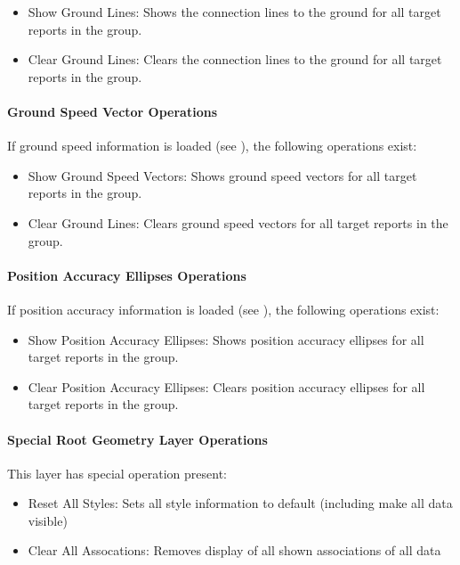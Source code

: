 \begin{itemize}
 \item Show Ground Lines: Shows the connection lines to the ground for all target reports in the group.
 \item Clear Ground Lines: Clears the connection lines to the ground for all target reports in the group.
\end{itemize} 


\paragraph{Ground Speed Vector Operations}
If ground speed information is loaded (see ), the following operations exist:

\begin{itemize}
 \item Show Ground Speed Vectors: Shows ground speed vectors for all target reports in the group.
 \item Clear Ground Lines: Clears ground speed vectors for all target reports in the group.
\end{itemize} 

\paragraph{Position Accuracy Ellipses Operations}
If position accuracy information is loaded (see ), the following operations exist:

\begin{itemize}
 \item Show Position Accuracy Ellipses: Shows position accuracy ellipses for all target reports in the group.
 \item Clear Position Accuracy Ellipses: Clears position accuracy ellipses for all target reports in the group.
\end{itemize} 

\paragraph{Special Root Geometry Layer Operations}
This layer has special operation present:

\begin{itemize}
 \item Reset All Styles: Sets all style information to default (including make all data visible)
 \item Clear All Assocations: Removes display of all shown associations of all data
\end{itemize} 

